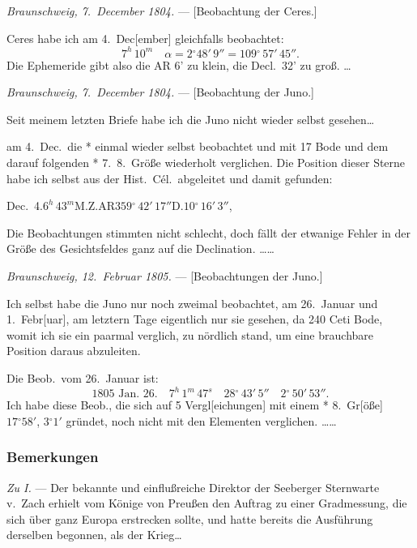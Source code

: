 \documentclass[12pt,a4paper]{article}
\newcommand{\degree}{\ensuremath{^\circ}}
\theoremstyle{plain}
\theoremstyle{definition}
\theoremstyle{remark}
\begin{document}
\textit{Braunschweig, 7.~December 1804.} --- [Beobachtung der Ceres.]

Ceres habe ich am 4.\ Dec[ember] gleichfalls beobachtet:
\[
7^h\,10^m\quad \alpha = 2\degree48'\,9'' = 109\degree\,57'\,45''.
\]
Die Ephemeride gibt also die AR 6' zu klein, die Decl.\ 32' zu groß.\,\,\ldots

\textit{Braunschweig, 7.~December 1804.} --- [Beobachtung der Juno.]

Seit meinem letzten Briefe habe ich die Juno nicht wieder selbst gesehen\ldots

am 4.\ Dec.\ die * einmal wieder selbst beobachtet und mit 17 Bode und dem darauf folgenden * 7.\ 8.\ Größe wiederholt verglichen. Die Position dieser Sterne habe ich selbst aus der Hist.\ Cél.\ abgeleitet und damit gefunden:

\begin{center}
Dec.\ 4.\quad $6^h\,43^m$\quad M.Z.\quad AR\quad $359\degree\,42'\,17''$\quad D.\quad $10\degree\,16'\,3''$,
\end{center}

Die Beobachtungen stimmten nicht schlecht, doch fällt der etwanige Fehler in der Größe des Gesichtsfeldes ganz auf die Declination.\,\,\ldots\ldots

\textit{Braunschweig, 12.~Februar 1805.} --- [Beobachtungen der Juno.]

Ich selbst habe die Juno nur noch zweimal beobachtet, am 26.\ Januar und 1.\ Febr[uar], am letztern Tage eigentlich nur sie gesehen, da 240 Ceti Bode, womit ich sie ein paarmal verglich, zu nördlich stand, um eine brauchbare Position daraus abzuleiten.

Die Beob.\ vom 26.\ Januar ist:
\[
1805\text{ Jan.\ }26.\quad 7^h\,1^m\,47^s\quad 28\degree\,43'\,5''\quad 2\degree\,50'\,53''.
\]
Ich habe diese Beob., die sich auf 5 Vergl[eichungen] mit einem * 8.\ Gr[öße] $17\degree58'$, $3\degree1'$ gründet, noch nicht mit den Elementen verglichen.\,\,\ldots\ldots

\subsubsection*{Bemerkungen}

\textit{Zu I.} --- Der bekannte und einflußreiche Direktor der Seeberger Sternwarte v.\ Zach erhielt vom Könige von Preußen den Auftrag zu einer Gradmessung, die sich über ganz Europa erstrecken sollte, und hatte bereits die Ausführung derselben begonnen, als der Krieg\ldots
\end{document}
